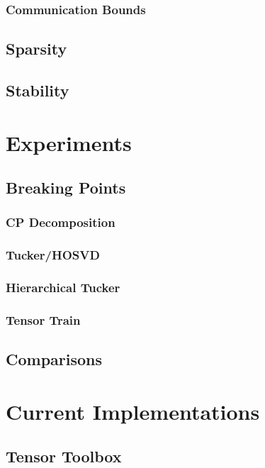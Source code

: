 \documentclass[10pt]{article}
\begin{document}
\subsubsection{Communication Bounds}
\subsection{Sparsity}
\subsection{Stability}
\section{Experiments}
\subsection{Breaking Points}
\subsubsection{CP Decomposition}
\subsubsection{Tucker/HOSVD}
\subsubsection{Hierarchical Tucker}
\subsubsection{Tensor Train}
\subsection{Comparisons}
\section{Current Implementations}
\subsection{Tensor Toolbox}
\end{document}
